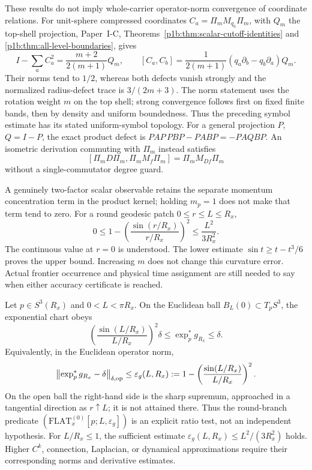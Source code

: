 \documentclass[12pt,a4paper]{article}
\begin{document}
\begin{remark}
\label{p2d:rem:v233-recovery-limits}
These results do not imply whole-carrier operator-norm convergence
of coordinate relations. For unit-sphere compressed coordinates
\(C_a=\Pi_mM_{q_a}\Pi_m\), with \(Q_m\) the top-shell projection,
Paper~I-C, Theorems~\ref{p1b:thm:scalar-cutoff-identities} and
\ref{p1b:thm:all-level-boundaries}, gives
\[
 I-\sum_a C_a^2=\frac{m+2}{2(m+1)}Q_m,\qquad
 [C_a,C_b]=\frac{1}{2(m+1)}
       (q_a\partial_b-q_b\partial_a)Q_m.
\]
Their norms tend to \(1/2\), whereas both defects vanish strongly
and the normalized radius-defect trace is \(3/(2m+3)\).
The norm statement uses the rotation weight \(m\) on the top shell;
strong convergence follows first on fixed finite bands, then by
density and uniform boundedness. Thus the preceding symbol estimate
has its stated uniform-symbol topology.
For a general projection \(P\), \(Q=I-P\), the exact product defect
is \(PAP\,PBP-PABP=-PAQBP\).
An isometric derivation commuting with \(\Pi_m\) instead satisfies
\[
 [\Pi_mD\Pi_m,\Pi_mM_f\Pi_m]=\Pi_mM_{Df}\Pi_m
\]
without a single-commutator degree guard.

A genuinely two-factor scalar observable retains the separate
momentum concentration term in the product kernel; holding \(m_p=1\)
does not make that term tend to zero.
For a round geodesic patch \(0\le r\le L\le R_x\),
\[
 0\le1-\left(\frac{\sin(r/R_x)}{r/R_x}\right)^2
       \le\frac{L^2}{3R_x^2}.
\]
The continuous value at \(r=0\) is understood. The lower estimate
\(\sin t\ge t-t^3/6\) proves the upper bound.
Increasing \(m\) does not change this curvature error.
Actual frontier occurrence and physical time assignment are still
needed to say when either accuracy certificate is reached.
\end{remark}


\begin{proposition}
\label{p2d:prop:exact-round-flatness}
Let \(p\in S^3(R_x)\) and \(0<L<\pi R_x\).  On the Euclidean ball
\(B_L(0)\subset T_pS^3\), the exponential chart obeys
\[
 \left(\frac{\sin(L/R_x)}{L/R_x}\right)^2\delta
 \le \exp_p^*g_{R_x}\le\delta .
\]
Equivalently, in the Euclidean operator norm,
\begin{equation}
\label{p2d:eq:exact-round-flatness-defect}
 \left\|\exp_p^*g_{R_x}-\delta\right\|_{\delta,{\rm op}}
 \le
 \varepsilon_g(L,R_x)
 :=1-\left(\frac{\sin(L/R_x)}{L/R_x}\right)^2.
\end{equation}
On the open ball the right-hand side is the sharp supremum, approached in a
tangential direction as \(r\uparrow L\); it is not attained there.  Thus the
round-branch predicate
\((\mathrm{FLAT}^{(0)}_x[p;L,\varepsilon_g])\) is an explicit ratio test,
not an independent hypothesis.  For \(L/R_x\le1\), the sufficient estimate
\(\varepsilon_g(L,R_x)\le L^2/(3R_x^2)\) holds.  Higher \(C^k\), connection,
Laplacian, or dynamical approximations require their corresponding norms and
derivative estimates.
\end{proposition}
\end{document}
